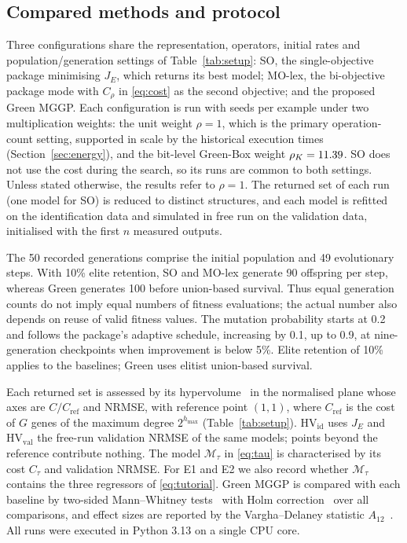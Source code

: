 \subsection{Compared methods and protocol}
Three configurations share the representation, operators, initial rates and population/generation settings of Table~\ref{tab:setup}:
SO, the single-objective package minimising $J_E$, which returns its best model;
MO-lex, the bi-objective package mode with $C_\rho$ in \eqref{eq:cost} as the second objective;
and the proposed Green MGGP. Each configuration is run with \nSeeds{} seeds per example under two multiplication
weights: the unit weight $\rho=1$, which is the primary operation-count setting, supported in scale by the historical execution times (Section~\ref{sec:energy}), and the bit-level Green-Box weight
$\rho_K=11.39$. SO does not use the cost during the search, so its runs are common to both settings. Unless stated
otherwise, the results refer to $\rho=1$. The returned set of each run
(one model for SO) is reduced to distinct structures, and each model is refitted on the identification data and
simulated in free run on the validation data, initialised with the first $n$ measured outputs.

The 50 recorded generations comprise the initial population and 49 evolutionary steps. With 10\% elite retention, SO and MO-lex generate 90 offspring per step, whereas Green generates 100 before union-based survival. Thus equal generation counts do not imply equal numbers of fitness evaluations; the actual number also depends on reuse of valid fitness values. The mutation probability starts at 0.2 and follows the package's adaptive schedule, increasing by 0.1, up to 0.9, at nine-generation checkpoints when improvement is below 5\%. Elite retention of 10\% applies to the baselines; Green uses elitist union-based survival.

Each returned set is assessed by its hypervolume~\cite{ZT1999} in the normalised plane whose axes are $C/C_\mathrm{ref}$ and NRMSE,
with reference point $(1,1)$, where $C_\mathrm{ref}$ is the cost of $G$ genes of the maximum degree $2^{h_{\max}}$
(Table~\ref{tab:setup}). $\mathrm{HV}_\mathrm{id}$ uses $J_E$ and $\mathrm{HV}_\mathrm{val}$ the free-run validation
NRMSE of the same models; points beyond the reference contribute nothing. The model $\mathcal M_\tau$ in \eqref{eq:tau}
is characterised by its cost $C_\tau$ and validation NRMSE. For E1 and E2 we also record whether $\mathcal M_\tau$
contains the three regressors of \eqref{eq:tutorial}. Green MGGP is compared with each baseline by two-sided
Mann--Whitney tests~\cite{MW1947} with Holm correction~\cite{Hol1979} over all comparisons, and effect sizes are
reported by the Vargha--Delaney statistic $A_{12}$~\cite{VD2000}. All runs were executed in Python 3.13 on a single
CPU core.

